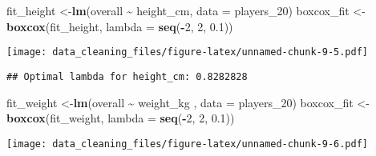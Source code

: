 \documentclass[
]{article}
\newenvironment{Shaded}{\begin{snugshade}}{\end{snugshade}}
\newcommand{\AttributeTok}[1]{\textcolor[rgb]{0.13,0.29,0.53}{#1}}
\newcommand{\DecValTok}[1]{\textcolor[rgb]{0.00,0.00,0.81}{#1}}
\newcommand{\FloatTok}[1]{\textcolor[rgb]{0.00,0.00,0.81}{#1}}
\newcommand{\FunctionTok}[1]{\textcolor[rgb]{0.13,0.29,0.53}{\textbf{#1}}}
\newcommand{\NormalTok}[1]{#1}
\newcommand{\OtherTok}[1]{\textcolor[rgb]{0.56,0.35,0.01}{#1}}
\newcommand{\SpecialCharTok}[1]{\textcolor[rgb]{0.81,0.36,0.00}{\textbf{#1}}}
\newcommand{\StringTok}[1]{\textcolor[rgb]{0.31,0.60,0.02}{#1}}
\begin{document}
\begin{Shaded}
\begin{Highlighting}[]
\NormalTok{fit\_height }\OtherTok{\textless{}{-}}\FunctionTok{lm}\NormalTok{(overall }\SpecialCharTok{\textasciitilde{}}\NormalTok{ height\_cm, }\AttributeTok{data =}\NormalTok{ players\_20)}
\NormalTok{boxcox\_fit }\OtherTok{\textless{}{-}} \FunctionTok{boxcox}\NormalTok{(fit\_height, }\AttributeTok{lambda =} \FunctionTok{seq}\NormalTok{(}\SpecialCharTok{{-}}\DecValTok{2}\NormalTok{, }\DecValTok{2}\NormalTok{, }\FloatTok{0.1}\NormalTok{))}
\end{Highlighting}
\end{Shaded}

\texttt{[image: data\_cleaning\_files/figure-latex/unnamed-chunk-9-5.pdf]}

\begin{Shaded}
\end{Shaded}

\begin{verbatim}
## Optimal lambda for height_cm: 0.8282828
\end{verbatim}

\begin{Shaded}
\begin{Highlighting}[]
\NormalTok{fit\_weight }\OtherTok{\textless{}{-}}\FunctionTok{lm}\NormalTok{(overall }\SpecialCharTok{\textasciitilde{}}\NormalTok{ weight\_kg , }\AttributeTok{data =}\NormalTok{ players\_20)}
\NormalTok{boxcox\_fit }\OtherTok{\textless{}{-}} \FunctionTok{boxcox}\NormalTok{(fit\_weight, }\AttributeTok{lambda =} \FunctionTok{seq}\NormalTok{(}\SpecialCharTok{{-}}\DecValTok{2}\NormalTok{, }\DecValTok{2}\NormalTok{, }\FloatTok{0.1}\NormalTok{))}
\end{Highlighting}
\end{Shaded}

\texttt{[image: data\_cleaning\_files/figure-latex/unnamed-chunk-9-6.pdf]}

\begin{Shaded}
\end{Shaded}
\end{document}
